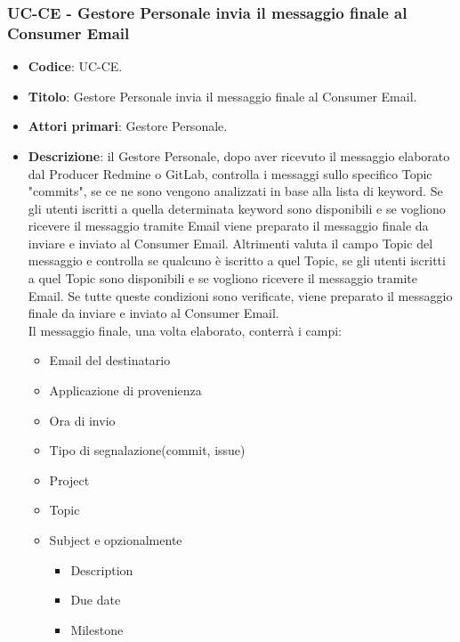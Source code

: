 \subsubsection{UC\theuccount-CE - Gestore Personale invia il messaggio finale al Consumer Email}
	\begin{itemize}
		\item \textbf{Codice}: UC\theuccount-CE.
		\item \textbf{Titolo}: Gestore Personale invia il messaggio finale al Consumer Email.
		\item \textbf{Attori primari}: Gestore Personale.
		\item \textbf{Descrizione}: il Gestore Personale, dopo aver ricevuto il messaggio elaborato dal
		Producer Redmine o GitLab, controlla i messaggi sullo specifico Topic "commits", se ce ne sono
		vengono analizzati in base alla	lista di keyword. Se gli utenti iscritti a quella determinata
		keyword sono disponibili e se vogliono ricevere il messaggio tramite Email viene preparato il
		messaggio finale da inviare e inviato al Consumer Email. Altrimenti valuta il campo Topic del
		messaggio e controlla se qualcuno è iscritto a quel Topic, se gli utenti iscritti a quel Topic sono
		disponibili e se vogliono ricevere il messaggio tramite Email. Se tutte queste condizioni sono
		verificate, viene preparato il messaggio finale da inviare e inviato al Consumer Email.\\
		Il messaggio finale, una volta elaborato, conterrà i campi:
		\begin{itemize}
			\item Email del destinatario
			\item Applicazione di provenienza
			\item Ora di invio
			\item Tipo di segnalazione(commit, issue)
			\item Project
			\item Topic
			\item Subject e opzionalmente
		 	\begin{itemize}
				\item Description
				\item Due date
				\item Milestone

\end{itemize}
\end{itemize}
\end{itemize}
